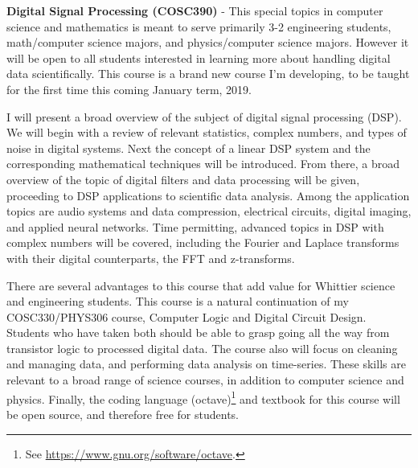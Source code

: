 \documentclass[../../main.tex]{subfiles}
\begin{document}
\label{sec:future}

\textbf{Digital Signal Processing (COSC390)} - This special topics in computer science and mathematics is meant to serve primarily 3-2 engineering students, math/computer science majors, and physics/computer science majors.  However it will be open to all students interested in learning more about handling digital data scientifically.  This course is a brand new course I'm developing, to be taught for the first time this coming January term, 2019. \\ \hspace{0.1cm}

I will present a broad overview of the subject of digital signal processing (DSP).  We will begin with a review of relevant statistics, complex numbers, and types of noise in digital systems. Next the concept of a linear DSP system and the corresponding mathematical techniques will be introduced. From there, a broad overview of the topic of digital filters and data processing will be given, proceeding to DSP applications to scientific data analysis. Among the application topics are audio systems and data compression, electrical circuits, digital imaging, and applied neural networks. Time permitting, advanced topics in DSP with complex numbers will be covered, including the Fourier and Laplace transforms with their digital counterparts, the FFT and z-transforms. \\ \hspace{0.1cm}

There are several advantages to this course that add value for Whittier science and engineering students.  This course is a natural continuation of my COSC330/PHYS306 course, Computer Logic and Digital Circuit Design.  Students who have taken both should be able to grasp going all the way from transistor logic to processed digital data.  The course also will focus on cleaning and managing data, and performing data analysis on time-series.  These skills are relevant to a broad range of science courses, in addition to computer science and physics.  Finally, the coding language (octave)\footnote{See \url{https://www.gnu.org/software/octave}.} and textbook \cite{dsp} for this course will be open source, and therefore free for students. \\ \hspace{0.1cm}
\end{document}
